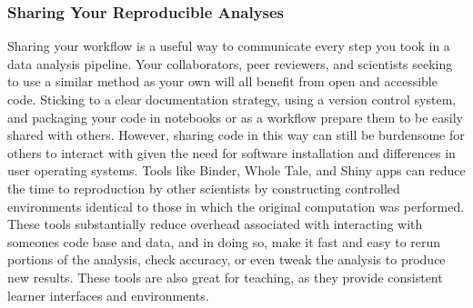 \documentclass[10pt,letterpaper]{article}
\begin{document}
\begin{greybox}
{%


}
\end{greybox}


\subsubsection*{Sharing Your Reproducible Analyses} 
Sharing your workflow is a useful way to communicate every step you took in a data analysis pipeline. 
Your collaborators, peer reviewers, and scientists seeking to use a similar method as your own will all benefit from open and accessible code. 
Sticking to a clear documentation strategy, using a version control system, and packaging your code in notebooks or as a workflow prepare them to be easily shared with others. 
However, sharing code in this way can still be burdensome for others to interact with given the need for software installation and differences in user operating systems. 
Tools like Binder, Whole Tale, and Shiny apps can reduce the time to reproduction by other scientists by constructing controlled environments identical to those in which the original computation was performed. 
These tools substantially reduce overhead associated with interacting with someones code base and data, and in doing so, make it fast and easy to rerun portions of the analysis, check accuracy, or even tweak the analysis to produce new results. 
These tools are also great for teaching, as they provide consistent learner interfaces and environments. 


\end{document}
